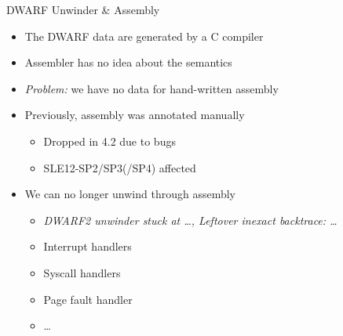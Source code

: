 \begin{frame}{DWARF Unwinder \& Assembly}

  \begin{itemize}[<+->]
    \item The DWARF data are generated by a C compiler
    \item Assembler has no idea about the semantics
    \item \emph{Problem:} we have no data for hand-written assembly

    \item Previously, assembly was annotated manually
    \begin{itemize}
      \item Dropped in 4.2 due to bugs
      \item SLE12-SP2/SP3(/SP4) affected
    \end{itemize}

    \item We can no longer unwind through assembly
    \begin{itemize}[<.->]
      \item<+-> \textit{DWARF2 unwinder stuck at \dots, Leftover inexact
	backtrace: \dots}

      \item<+-> Interrupt handlers
      \item Syscall handlers
      \item Page fault handler
      \item \dots
    \end{itemize}
  \end{itemize}

\end{frame}



